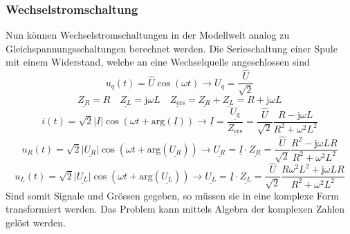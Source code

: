 \subsubsection{Wechselstromschaltung}
Nun können Wechselstromschaltungen in der Modellwelt analog zu Gleichspannungsschaltungen berechnet werden. Die Serieschaltung einer Spule mit einem Widerstand, welche an eine Wechselquelle angeschlossen sind
\begin{equation}
\boxed{u_q\left(t\right)=\hat{U}\cos\left(\omega t\right)\longrightarrow U_q=\dfrac{\hat{U}}{\sqrt{2}}}
\end{equation}
\begin{equation}
\boxed{\underline{Z_R}=R}\quad \boxed{\underline{Z_L}=\text{j}\omega L}\quad \boxed{\underline{Z_{\text{ers}}}=\underline{Z_R}+\underline{Z_L}=R+\text{j}\omega L}
\end{equation}
\begin{equation}
\boxed{i\left(t\right)=\sqrt{2}\Big\vert\underline{I}\Big\vert\cos\left(\omega t+\text{arg}\left(\underline{I}\right)\right)\longrightarrow \underline{I}=\dfrac{\underline{U_q}}{\underline{Z_{\text{ers}}}}=\dfrac{\hat{U}}{\sqrt{2}}\dfrac{R-\text{j}\omega L}{R^2+\omega^2L^2}}
\end{equation}
\begin{equation}
\boxed{u_R\left(t\right)=\sqrt{2}\Big\vert\underline{U_R}\Big\vert\cos\left(\omega t+\text{arg}\left(\underline{U_R}\right)\right)\longrightarrow \underline{U_R}=\underline{I}\cdot \underline{Z_R}=\dfrac{\hat{U}}{\sqrt{2}}\dfrac{R^2-\text{j}\omega LR}{R^2+\omega^2L^2}}
\end{equation}
\begin{equation}
\boxed{u_L\left(t\right)=\sqrt{2}\Big\vert\underline{U_L}\Big\vert\cos\left(\omega t+\text{arg}\left(\underline{U_L}\right)\right)\longrightarrow \underline{U_L}=\underline{I}\cdot \underline{Z_L}=\dfrac{\hat{U}}{\sqrt{2}}\dfrac{R\omega^2L^2+\text{j}\omega LR}{R^2+\omega^2L^2}}
\end{equation}
Sind somit Signale und Grössen gegeben, so müssen sie in eine komplexe Form transformiert werden. Das Problem kann mittels Algebra der komplexen Zahlen gelöst werden.
